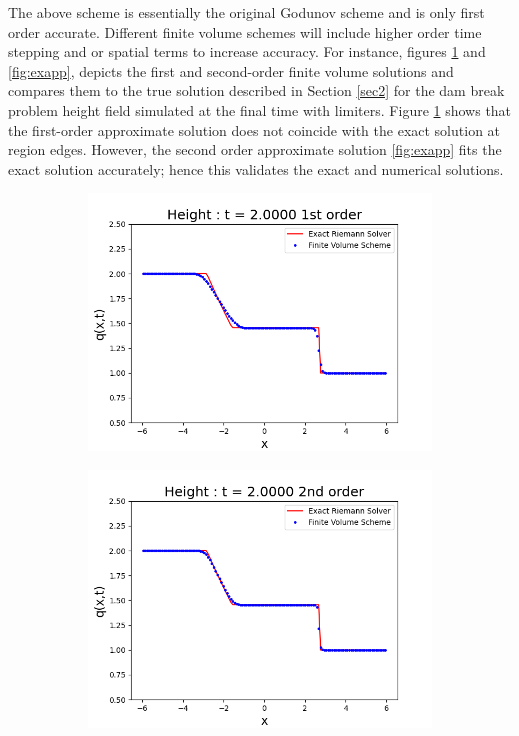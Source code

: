 \documentclass[10pt,a4paper]{article}
\begin{document}
The above  scheme is essentially the original Godunov scheme \cite{godunov1959difference} and is only first order accurate.  Different finite volume schemes will include higher order time stepping and or spatial terms to increase accuracy.  For instance, figures \ref{fig:exap} and \ref{fig:exapp}, depicts the first and second-order finite volume solutions and compares them to the true solution described in Section \ref{sec2} for the dam break problem height field simulated at the final time with limiters. Figure \ref{fig:exap}  shows that the first-order approximate solution does not coincide with the exact solution at region edges. However, the second order approximate solution \ref{fig:exapp}  fits the exact solution accurately; hence this validates the exact and numerical solutions.
	\begin{figure}[H]
		\begin{subfigure}[b]{0.5\textwidth}
			\centering
			\includegraphics[width=1.0\linewidth]{images/exap}
			\caption{}
			\label{fig:exap}
		\end{subfigure}
		\begin{subfigure}[b]{0.5\textwidth}
			\centering
			\includegraphics[width=1.0\linewidth]{images/exapp}

\end{subfigure}
\end{figure}
\end{document}
